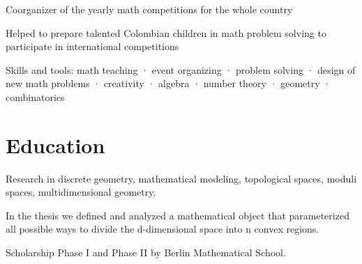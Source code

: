 \documentclass[]{plushcv}
\begin{document}
\begin{minipage}[t]{0.70\textwidth}
\begin{tightemize}
  \sectionsep
\item Coorganizer of the yearly math competitions for the whole country
\item Helped to prepare talented Colombian children in math problem solving to participate in international competitions
  
\item Skills and tools: math teaching  · event organizing  · problem solving  · design of new math problems · creativity · algebra  · number theory  · geometry  · combinatorics
\end{tightemize}
\sectionsep








\section{Education} 
\begin{tightemize}
\item Research in discrete geometry, mathematical modeling, topological spaces, moduli spaces, multidimensional geometry.
\item In the thesis we defined and analyzed a mathematical object that parameterized all possible ways to divide the d-dimensional space into n convex regions.
  \item Scholarship Phase I and Phase II by Berlin Mathematical School.\end{tightemize}
\sectionsep


\end{minipage}
\end{document}
